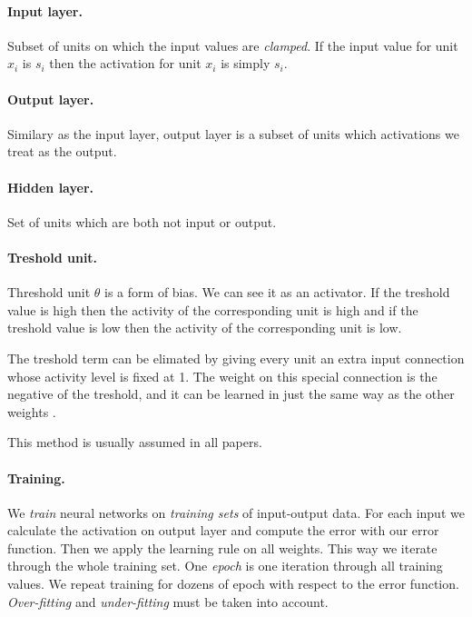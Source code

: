 \paragraph{Input layer.}
Subset of units on which the input values are \emph{clamped}. If the input value for unit $x_i$ is $s_i$ then the activation for unit $x_i$ is simply $s_i$. 

\paragraph{Output layer.}
Similary as the input layer, output layer is a subset of units which activations we treat as the output. 

\paragraph{Hidden layer.}
Set of units which are both not input or output. 

\paragraph{Treshold unit.}
Threshold unit $\theta$ is a form of bias. We can see it as an activator. If the treshold value is high then the activity of the corresponding unit is high and if the treshold value is low then the activity of the corresponding unit is low. 

The treshold term can be elimated by giving every unit an extra input connection whose activity level is fixed at 1. The weight on this special connection is the negative of the treshold, and it can be learned in just the same way as the other weights  \citet{hinton1988learning}.

This method is usually assumed in all papers. 

\paragraph{Training.}
We \emph{train} neural networks on \emph{training sets} of input-output data. For each input we calculate the activation on output layer and compute the error with our error function. Then we apply the learning rule on all weights. This way we iterate through the whole training set. One \emph{epoch} is one iteration through all training values. We repeat training for dozens of epoch with respect to the error function. \emph{Over-fitting} and \emph{under-fitting} must be taken into account.   

